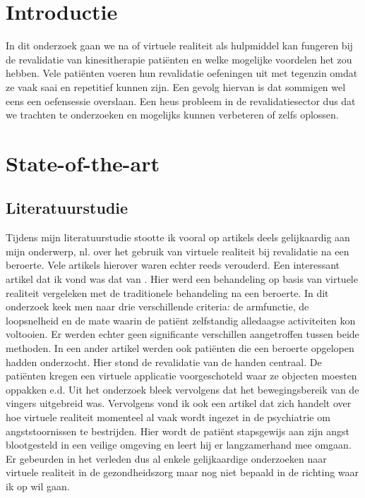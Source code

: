 
\section{Introductie} %
\label{sec:introductie}

In dit onderzoek gaan we na of virtuele realiteit als hulpmiddel kan fungeren bij de revalidatie van kinesitherapie patiënten en welke mogelijke voordelen het zou hebben. Vele patiënten voeren hun revalidatie oefeningen uit met tegenzin omdat ze vaak saai en repetitief kunnen zijn. Een gevolg hiervan is dat sommigen wel eens een oefensessie overslaan. Een heus probleem in de revalidatiesector dus dat we trachten te onderzoeken en mogelijks kunnen verbeteren of zelfs oplossen.




\section{State-of-the-art}
\label{sec:state-of-the-art}

\subsection{Literatuurstudie}
Tijdens mijn literatuurstudie stootte ik vooral op artikels deels gelijkaardig aan mijn onderwerp, nl. over het gebruik van virtuele realiteit bij revalidatie na een beroerte. Vele artikels hierover waren echter reeds verouderd. Een interessant artikel dat ik vond was dat van \textcite{Laver2017}. Hier werd een behandeling op basis van virtuele realiteit vergeleken met de traditionele behandeling na een beroerte. In dit onderzoek keek men naar drie verschillende criteria: de armfunctie, de loopsnelheid en de mate waarin de patiënt zelfstandig alledaagse activiteiten kon voltooien. Er werden echter geen significante verschillen aangetroffen tussen beide methoden. In een ander artikel \textcite{Boian2002} werden ook patiënten die een beroerte opgelopen hadden onderzocht. Hier stond de revalidatie van de handen centraal. De patiënten kregen een virtuele applicatie voorgeschoteld waar ze objecten moesten oppakken e.d. Uit het onderzoek bleek vervolgens dat het bewegingsbereik van de vingers uitgebreid was.  Vervolgens vond ik ook een artikel \textcite{Reddy2018} dat zich handelt over hoe virtuele realiteit momenteel al vaak wordt ingezet in de psychiatrie om angststoornissen te bestrijden. Hier wordt de patiënt stapsgewijs aan zijn angst blootgesteld in een veilige omgeving en leert hij er langzamerhand mee omgaan. Er gebeurden in het verleden dus al enkele gelijkaardige onderzoeken naar virtuele realiteit in de gezondheidszorg maar nog niet bepaald in de richting waar ik op wil gaan.

